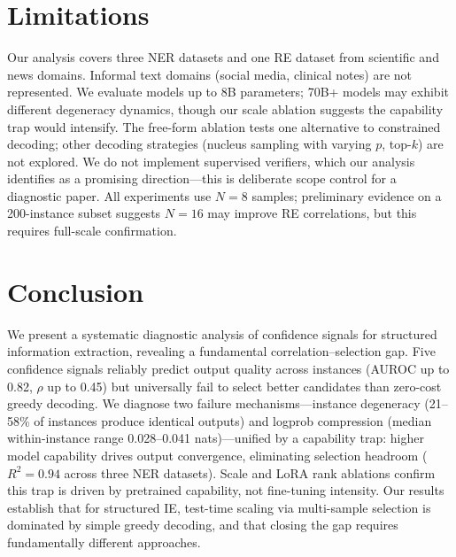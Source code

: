 \documentclass[11pt,twocolumn]{article}
\begin{document}
\section{Limitations}
\label{sec:limitations}

Our analysis covers three NER datasets and one RE dataset from scientific and news domains.
Informal text domains (social media, clinical notes) are not represented.
We evaluate models up to 8B parameters; 70B+ models may exhibit different degeneracy dynamics, though our scale ablation suggests the capability trap would intensify.
The free-form ablation tests one alternative to constrained decoding; other decoding strategies (nucleus sampling with varying $p$, top-$k$) are not explored.
We do not implement supervised verifiers, which our analysis identifies as a promising direction---this is deliberate scope control for a diagnostic paper.
All experiments use $N{=}8$ samples; preliminary evidence on a 200-instance subset suggests $N{=}16$ may improve RE correlations, but this requires full-scale confirmation.

\section{Conclusion}
\label{sec:conclusion}

We present a systematic diagnostic analysis of confidence signals for structured information extraction, revealing a fundamental correlation--selection gap.
Five confidence signals reliably predict output quality across instances (AUROC up to 0.82, $\rho$ up to 0.45) but universally fail to select better candidates than zero-cost greedy decoding.
We diagnose two failure mechanisms---instance degeneracy (21--58\% of instances produce identical outputs) and logprob compression (median within-instance range 0.028--0.041 nats)---unified by a capability trap: higher model capability drives output convergence, eliminating selection headroom ($R^2{=}0.94$ across three NER datasets).
Scale and LoRA rank ablations confirm this trap is driven by pretrained capability, not fine-tuning intensity.
Our results establish that for structured IE, test-time scaling via multi-sample selection is dominated by simple greedy decoding, and that closing the gap requires fundamentally different approaches.
\end{document}
